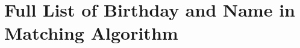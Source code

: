 \documentclass{sig-alternate}
\begin{document}

%
%
\appendix
\section{Full List of Birthday and Name in Matching Algorithm}
\end{document}
